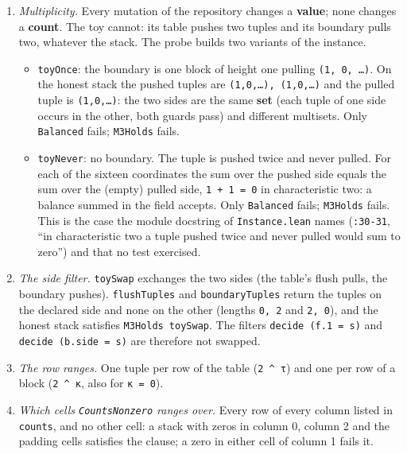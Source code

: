 \begin{enumerate}
\item \emph{Multiplicity.} Every mutation of the repository changes a \textbf{value}; none changes a \textbf{count}. The toy cannot: its table pushes two tuples and its boundary pulls two, whatever the stack. The probe builds two variants of the instance.

\begin{itemize}
\item \texttt{toyOnce}: the boundary is one block of height one pulling \texttt{(\allowbreak{}1,\allowbreak{} 0,\allowbreak{} …)}. On the honest stack the pushed tuples are \texttt{(\allowbreak{}1,\allowbreak{}0,\allowbreak{}…),\allowbreak{} (\allowbreak{}1,\allowbreak{}0,\allowbreak{}…)} and the pulled tuple is \texttt{(\allowbreak{}1,\allowbreak{}0,\allowbreak{}…)}: the two sides are the same \textbf{set} (each tuple of one side occurs in the other, both guards pass) and different multisets. Only \texttt{Balanced} fails; \texttt{M3Holds} fails.
\item \texttt{toyNever}: no boundary. The tuple is pushed twice and never pulled. For each of the sixteen coordinates the sum over the pushed side equals the sum over the (empty) pulled side, \texttt{1 + 1 = 0} in characteristic two: a balance summed in the field accepts. Only \texttt{Balanced} fails; \texttt{M3Holds} fails. This is the case the module docstring of \texttt{Instance.\allowbreak{}lean} names (\texttt{:30-{}31}, \enquote{in characteristic two a tuple pushed twice and never pulled would sum to zero}) and that no test exercised.
\end{itemize}
\item \emph{The side filter.} \texttt{toySwap} exchanges the two sides (the table's flush pulls, the boundary pushes). \texttt{flushTuples} and \texttt{boundaryTuples} return the tuples on the declared side and none on the other (lengths \texttt{0,\allowbreak{} 2} and \texttt{2,\allowbreak{} 0}), and the honest stack satisfies \texttt{M3Holds toySwap}. The filters \texttt{decide (\allowbreak{}f.\allowbreak{}1 = s)} and \texttt{decide (\allowbreak{}b.\allowbreak{}side = s)} are therefore not swapped.
\item \emph{The row ranges.} One tuple per row of the table (\texttt{2 \textasciicircum{} τ}) and one per row of a block (\texttt{2 \textasciicircum{} κ}, also for \texttt{κ = 0}).
\item \emph{Which cells \texttt{CountsNonzero} ranges over.} Every row of every column listed in \texttt{counts}, and no other cell: a stack with zeros in column 0, column 2 and the padding cells satisfies the clause; a zero in either cell of column 1 fails it.
\end{enumerate}

